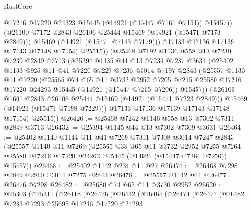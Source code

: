 \begin{lexlean}{RustCore}
\begin{coremodule}
                  @17216
                  @17220
                  @24323
                  @15445
                  (@14921 (@15447 @7161 @7151))
                  @15457))
              (@26100 @7172 @2843 @26106 @25444 @15469 (@14921 (@15471 @7173 @2849)))
              @15469
              (@14921 (@15471 @7143 @7179)))
            @17133
            @17136
            @17139
            @17143
            @17148
            @17154)
          @25515))
      (@25468
        @7192
        @1136
        @558
        @13
        @7230
        @7239
        @2849
        @3713
        (@25394
          @1135
          @44
          @13
          @7230
          @7237
          @3631
          (@25402
            @1133
            @925
            @11
            @41
            @7220
            @7229
            @7236
            @3014
            @7197
            @2843
            (@25557
              @1133
              @11
              @7220
              (@25565
                @74
                @65
                @11
                @3732
                @2952
                @7205
                @7215
                @25580
                @17216
                @17220
                @24293
                @15445
                (@14921 (@15447 @7215 @7206))
                @15457))
            (@26100 @1601 @2843 @26106 @25444 @15469 (@14921 (@15471 @7223 @2849)))
            @15469
            (@14921 (@15471 @7198 @7229)))
          @17133
          @17136
          @17139
          @17143
          @17148
          @17154)
        @25515))
@26426 := @25468 @7242 @1146 @558 @13 @7302 @7311 @2849 @3713
@26432 := @25394 @1145 @44 @13 @7302 @7309 @3631
@26464 := @25402
    @1140
    @1144
    @11
    @41
    @7269
    @7301
    @7308
    @3014
    @7247
    @2843
    (@25557
      @1140
      @11
      @7269
      (@25565
        @38
        @65
        @11
        @3732
        @2952
        @7255
        @7264
        @25580
        @17216
        @17220
        @24263
        @15445
        (@14921 (@15447 @7264 @7256))
        @15457))
@26468 := @25402 @1142 @234 @11 @27
@26474 := @26468 @7298 @2849 @2910 @3014 @7275 @2843
@26476 := @25557 @1142 @11
@26477 := @26476 @7298
@26482 := @25680 @74 @65 @11 @3730 @2952
@26620 := @25303
    (@25311
      (@26418
        (@26426
          (@26432
            (@26464
              (@26474
                (@26477
                  (@26482
                    @7283
                    @7293
                    @25695
                    @17216
                    @17220
                    @24293

\end{coremodule}
\end{lexlean}
